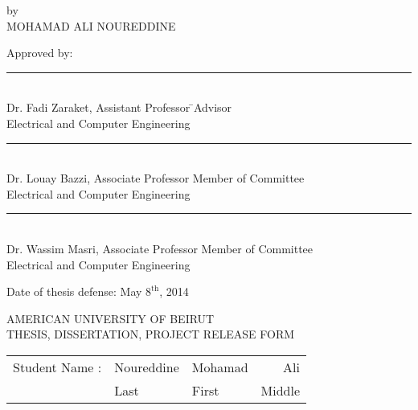 \begin{titlepage}
\begin{center}
\normalsize{by\\} \Large{MOHAMAD ALI NOUREDDINE\\}

\vspace{1cm}
\vspace{-0.5cm}
\begin{tabbing}
\normalsize{Approved by:} \quad\quad \quad \quad
 \= \\
\rule[.8mm]{14cm}{.08mm}\\
\small{Dr. Fadi Zaraket, Assistant Professor}  \quad\quad\quad \quad \quad\quad \quad \quad \quad \=\small{Advisor} \\
\small{Electrical and Computer
 Engineering}
 \\
 \rule[.8mm]{14cm}{.08mm}\\
\small{Dr. Louay Bazzi, Associate Professor}  \>\small{Member of Committee} \\
\small{Electrical and Computer
 Engineering}
 \\
 \rule[.8mm]{14cm}{.08mm}\\
\small{Dr. Wassim Masri, Associate Professor}  \>\small{Member of Committee} \\
\small{Electrical and Computer
 Engineering}
 \\
 

\end{tabbing}



\end{center}
\vspace{0.5cm}
 \normalsize{Date of thesis defense:
 May $8^{\mathrm{th}}$, 2014
 }\newpage
\begin{center}\LARGE{AMERICAN UNIVERSITY OF BEIRUT\\}
 \vspace{3cm}
 \LARGE{THESIS, DISSERTATION, PROJECT  RELEASE FORM\\} \vspace{2.5cm}
\end{center}
\begin{tabularx}{\textwidth}{lXXr}
Student Name : & Noureddine & Mohamad & Ali \\
\cline{2-4}
& Last & First & Middle 
\end{tabularx}
\vspace{0.5cm}


\end{titlepage}
